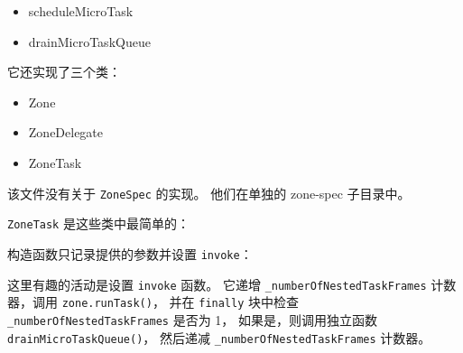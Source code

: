 \begin{itemize}
  \item scheduleMicroTask
  \item drainMicroTaskQueue
\end{itemize}


它还实现了三个类：

\begin{itemize}
  \item Zone
  \item ZoneDelegate
  \item ZoneTask
\end{itemize}


该文件没有关于 \texttt{ZoneSpec} 的实现。
他们在单独的 zone-spec 子目录中。


\texttt{ZoneTask} 是这些类中最简单的：




构造函数只记录提供的参数并设置 \texttt{invoke}：




这里有趣的活动是设置 \texttt{invoke} 函数。
它递增 \texttt{\_numberOfNestedTaskFrames} 计数器，调用 \texttt{zone.runTask()}，
并在 \texttt{finally} 块中检查 \texttt{\_numberOfNestedTaskFrames} 是否为 1，
如果是，则调用独立函数 \texttt{drainMicroTaskQueue()}，
然后递减 \texttt{\_numberOfNestedTaskFrames} 计数器。





